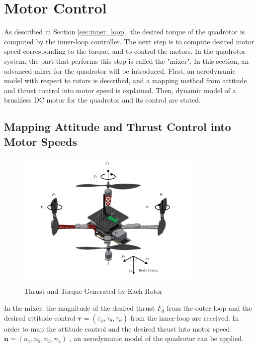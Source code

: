 \section{Motor Control}
\label{sec:motor_control}

As described in Section \ref{sec:inner_loop}, the desired torque of the quadrotor is computed by the inner-loop controller. The next step is to compute desired motor speed corresponding to the torque, and to control the motors. In the quadrotor system, the part that performs this step is called the "mixer". In this section, an advanced mixer for the quadrotor will be introduced. First, an aerodynamic model with respect to rotors is described, and a mapping method from attitude and thrust control into motor speed is explained. Then, dynamic model of a brushless DC motor for the quadrotor and its control are stated.

\subsection{Mapping Attitude and Thrust Control into Motor Speeds}

\begin{figure}
    \centering
    \includegraphics[width=0.8\textwidth]{graphics/mixer.pdf}
    \caption{Thrust and Torque Generated by Each Rotor}
    \label{fig:mixer}
\end{figure}

In the mixer, the magnitude of the desired thrust \(F_d\) from the outer-loop and the desired attitude control \({\boldsymbol \tau} = (\tau_{\phi}, \tau_{\theta}, \tau_{\psi})\) from the inner-loop are received. In order to map the attitude control and the desired thrust into motor speed \( {\boldsymbol n} = (n_1, n_2, n_3, n_4)\) , an aerodynamic model of the quadrotor can be applied.

